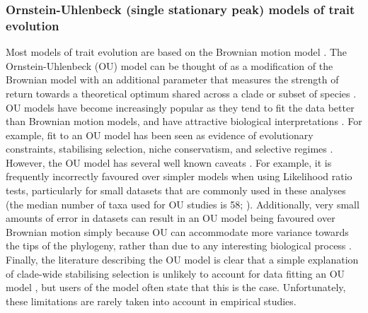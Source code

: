 \documentclass[a4paper,12pt]{article}
\begin{document}
\subsubsection{Ornstein-Uhlenbeck (single stationary peak) models of trait evolution}
Most models of trait evolution are based on the Brownian motion model \citep{cavalli1967,felsenstein1973maximum}.
The Ornstein-Uhlenbeck (OU) model can be thought of as a modification of the Brownian model with an additional parameter that measures the strength of return towards a theoretical optimum shared across a clade or subset of species \citep{hansen1997stabilizing,Butler:2004aa}.
OU models have become increasingly popular as they tend to fit the data better than Brownian motion models, and have attractive biological interpretations \citep{cooper2016}.
For example, fit to an OU model has been seen as evidence of evolutionary constraints, stabilising selection, niche conservatism, and selective regimes \citep{Wiens:2010aa,beaulieu2012modeling,christin2013anatomical,mahler2013exceptional}.
However, the OU model has several well known caveats \citep[see][]{ives2010phylogenetic,boettiger2012your,hansen2012interpreting,ho2013asymptotic,ho2014intrinsic}. 
For example, it is frequently incorrectly favoured over simpler models when using Likelihood ratio tests, particularly for small datasets that are commonly used in these analyses (the median number of taxa used for OU studies is 58; \citealp{cooper2016}). 
Additionally, very small amounts of error in datasets can result in an OU model being favoured over Brownian motion simply because OU can accommodate more variance towards the tips of the phylogeny, rather than due to any interesting biological process \citep{boettiger2012your,pennell2015model}.
Finally, the literature describing the OU model is clear that a simple explanation of clade-wide stabilising selection is unlikely to account for data fitting an OU model \citep[e.g.][]{hansen1997stabilizing,hansen2005assessing}, but users of the model often state that this is the case.
Unfortunately, these limitations are rarely taken into account in empirical studies.
\end{document}
